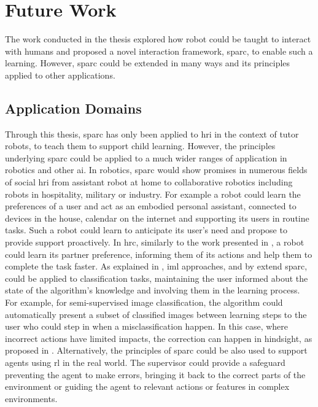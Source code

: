 \section{Future Work}
The work conducted in the thesis explored how robot could be taught to interact with humans and proposed a novel interaction framework, \gls{sparc}, to enable such a learning. However, \gls{sparc} could be extended in many ways and its principles applied to other applications.

\subsection{Application Domains}

Through this thesis, \gls{sparc} has only been applied to \gls{hri} in the context of tutor robots, to teach them to support child learning. However, the principles underlying \gls{sparc} could be applied to a much wider ranges of application in robotics and other \gls{ai}. In robotics, \gls{sparc} would show promises in numerous fields of social \gls{hri} from assistant robot at home to collaborative robotics including robots in hospitality, military or industry. For example a robot could learn the preferences of a user and act as an embodied personal assistant, connected to devices in the house, calendar on the internet and supporting its users in routine tasks. Such a robot could learn to anticipate its user's need and propose to provide support proactively. In \gls{hrc}, similarly to the work presented in \cite{munzer2017efficient}, a robot could learn its partner preference, informing them of its actions and help them to complete the task faster. As explained in \cite{feil2005defining}, \gls{iml} approaches, and by extend \gls{sparc}, could be applied to classification tasks, maintaining the user informed about the state of the algorithm's knowledge and involving them in the learning process. For example, for semi-supervised image classification, the algorithm could automatically present a subset of classified images between learning steps to the user who could step in when a misclassification happen. In this case, where incorrect actions have limited impacts, the correction can happen in hindsight, as proposed in \cite{chernova2009interactive}. Alternatively, the principles of \gls{sparc} could be also used to support agents using \gls{rl} in the real world. The supervisor could provide a safeguard preventing the agent to make errors, bringing it back to the correct parts of the environment or guiding the agent to relevant actions or features in complex environments.

